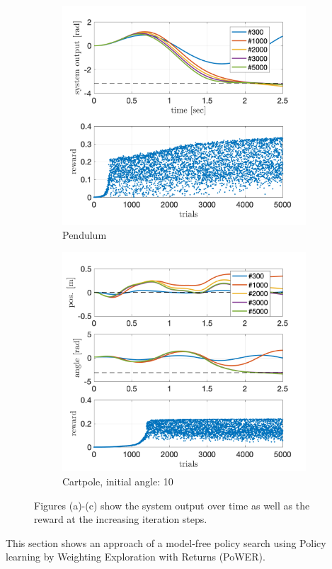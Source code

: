 \documentclass[letterpaper, 10 pt, conference]{ieeeconf}  %
\begin{document}
\begin{figure}[!thp]
\begin{subfigure}{0.325\textwidth}
	\includegraphics[width=\textwidth]{julia_pend_quad.png}
	\caption{Pendulum \newline}\label{fig:PoWER_pendulum}
	\end{subfigure}
	\begin{subfigure}{0.325\textwidth}
	\includegraphics[width=\textwidth]{julia_cp10_quad.png}
	\caption{Cartpole, initial angle: 10\textdegree}\label{fig:PoWER_cp}
	\end{subfigure}\caption{Figures (a)-(c) show the system output over time as well as the reward at the increasing iteration steps.}\label{fig:PoWER}
\end{figure} 
This section shows an approach of a model-free policy search using Policy learning by Weighting Exploration with Returns (PoWER).
\end{document}
